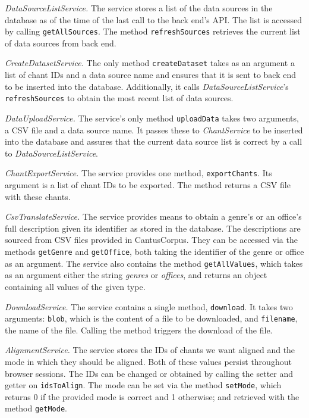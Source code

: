 \emph{DataSourceListService.} The service stores a list of the data sources in the database as of the time of the last call to the back end's API. The list
is accessed by calling \verb|getAllSources|. The method \verb|refreshSources| retrieves the current list of data sources from back end.

\emph{CreateDatasetService.} The only method \verb|createDataset| takes as an argument a list of chant IDs and a data source name and ensures that it is sent to 
back end to be inserted into the database. Additionally, it calls \emph{DataSourceListService}'s \verb|refreshSources| to obtain the most recent list
of data sources.

\emph{DataUploadService.} The service's only method \verb|uploadData| takes two arguments, a CSV file and a data source name. It passes these to \emph{ChantService}
to be inserted into the database and assures that the current data source list is correct by a call to \emph{DataSourceListService}.

\emph{ChantExportService.} The service provides one method, \verb|exportChants|. Its argument is a list of chant IDs to be exported. The method returns a CSV
file with these chants.

\emph{CsvTranslateService.} The service provides means to obtain a genre's or an office's full description given its identifier as stored in the database.
The descriptions are sourced from CSV files provided in CantusCorpus. They can be accessed via the methods \verb|getGenre| and \verb|getOffice|, both
taking the identifier of the genre or office as an argument. The service also contains the method \verb|getAllValues|, which takes as an argument either
the string \emph{genres} or \emph{offices}, and returns an object containing all values of the given type.

\emph{DownloadService.} The service contains a single method, \verb|download|. It takes two arguments: \verb|blob|, which is the content of a file to
be downloaded, and \verb|filename|, the name of the file. Calling the method triggers the download of the file.

\emph{AlignmentService.} The service stores the IDs of chants we want aligned and the mode in which they should be aligned. Both of these values persist
throughout browser sessions. The IDs can be changed or obtained by calling the setter and getter on \verb|idsToAlign|. The mode can be set via the method
\verb|setMode|, which returns 0 if the provided mode is correct and 1 otherwise; and retrieved with the method \verb|getMode|.

